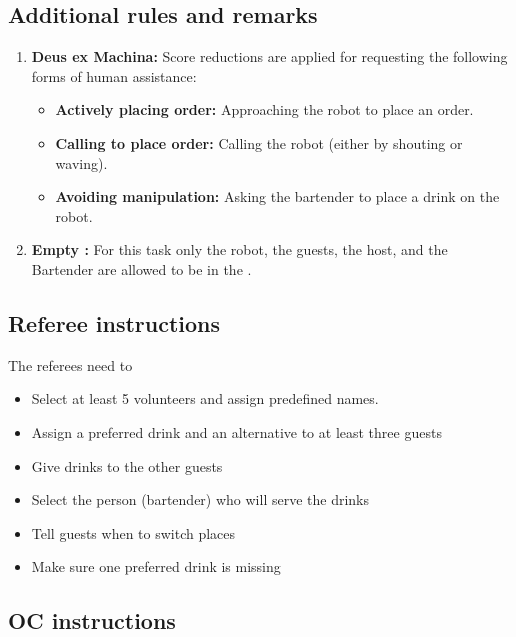 \subsection*{Additional rules and remarks}
\begin{enumerate}

	\item \textbf{Deus ex Machina:} Score reductions are applied for requesting the following forms of human assistance:
	\begin{itemize}[nosep]
		\item \textbf{Actively placing order:} Approaching the robot to place an order.

		\item \textbf{Calling to place order:} Calling the robot (either by shouting or waving).

		\item \textbf{Avoiding manipulation:} Asking the bartender to place a drink on the robot.
		
	\end{itemize}

	\item \textbf{Empty \Arena{}:} For this task only the robot, the guests, the host, and the Bartender are allowed to be in the \Arena{}.
\end{enumerate}

\subsection*{Referee instructions}

The referees need to
\begin{itemize}
	\item Select at least 5 volunteers and assign predefined names.
	\item Assign a preferred drink and an alternative to at least three guests
	\item Give drinks to the other guests
	\item Select the person (bartender) who will serve the drinks
	\item Tell guests when to switch places
	\item Make sure one preferred drink is missing
\end{itemize}

\subsection*{OC instructions}

